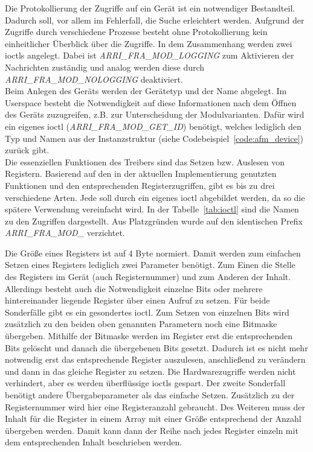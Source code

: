 Die Protokollierung der Zugriffe auf ein Gerät ist ein notwendiger Bestandteil. Dadurch soll, vor allem im Fehlerfall, die Suche erleichtert werden. Aufgrund der Zugriffe durch verschiedene Prozesse besteht ohne Protokollierung kein einheitlicher Überblick über die Zugriffe.
In dem Zusammenhang werden zwei \ac{ioctl}s angelegt. Dabei ist \mbox{\textit{ARRI\_FRA\_MOD\_LOGGING}} zum Aktivieren der Nachrichten zuständig und analog werden diese durch \mbox{\textit{ARRI\_FRA\_MOD\_NOLOGGING}} deaktiviert. \\

Beim Anlegen des Geräts werden der Gerätetyp und der Name abgelegt. Im Userspace besteht die Notwendigkeit auf diese Informationen nach dem Öffnen des Geräts zuzugreifen, z.B. zur Unterscheidung der Modulvarianten. Dafür wird ein eigenes \ac{ioctl} (\mbox{\textit{ARRI\_FRA\_MOD\_GET\_ID}}) benötigt, welches lediglich den Typ und Namen aus der Instanzstruktur (siehe Codebeispiel~\ref{code:afm_device}) zurück gibt.\\

Die essenziellen Funktionen des Treibers sind das Setzen bzw. Auslesen von Registern. Basierend auf den in der aktuellen Implementierung genutzten Funktionen und den entsprechenden Registerzugriffen, gibt es bis zu drei verschiedene Arten. Jede soll durch ein eigenes \ac{ioctl} abgebildet werden, da so die spätere Verwendung vereinfacht wird.  In der Tabelle~\ref{tab:ioctl} sind die Namen zu den Zugriffen dargestellt. Aus Platzgründen wurde auf den identischen Prefix \mbox{\textit{ARRI\_FRA\_MOD\_}} verzichtet.



Die Größe eines Registers ist auf 4 Byte normiert. Damit werden zum einfachen Setzen eines Registers lediglich zwei Parameter benötigt. Zum Einen die Stelle des Registers im Gerät (auch Registernummer) und zum Anderen der Inhalt. 
Allerdings besteht auch die Notwendigkeit einzelne Bits oder mehrere hintereinander liegende Register über einen Aufruf zu setzen. Für beide Sonderfälle gibt es ein gesondertes \ac{ioctl}. Zum Setzen von einzelnen Bits wird zusätzlich zu den beiden oben genannten Parametern noch eine Bitmaske übergeben. Mithilfe der Bitmaske werden im Register erst die entsprechenden Bits gelöscht und danach die übergebenen Bits gesetzt. Dadurch ist es nicht mehr notwendig erst das entsprechende Register auszulesen, anschließend zu verändern und dann in das gleiche Register zu setzen. Die Hardwarezugriffe werden nicht verhindert, aber es werden überflüssige \ac{ioctl}s gespart.
Der zweite Sonderfall benötigt andere Übergabeparameter als das einfache Setzen. Zusätzlich zu der Registernummer wird hier eine Registeranzahl gebraucht. Des Weiteren muss der Inhalt für die Register in einem Array mit einer Größe entsprechend der Anzahl übergeben werden. Damit kann dann der Reihe nach jedes Register einzeln mit dem entsprechenden Inhalt beschrieben werden.\\


